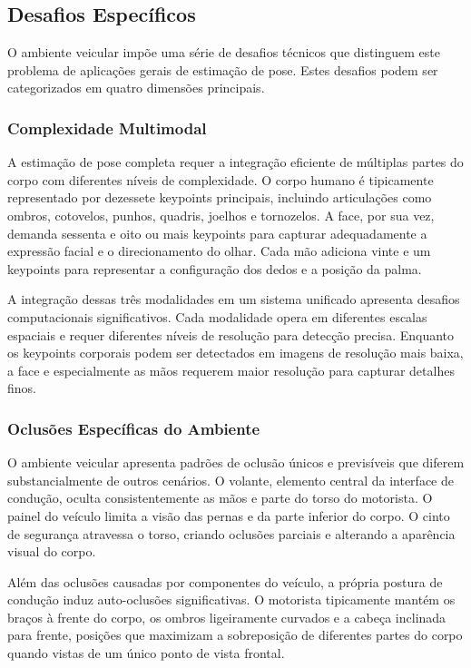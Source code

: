 \documentclass[12pt, a4paper]{article}
\begin{document}
\subsection{Desafios Específicos}

O ambiente veicular impõe uma série de desafios técnicos que distinguem este problema de aplicações gerais de estimação de pose. Estes desafios podem ser categorizados em quatro dimensões principais.

\subsubsection{Complexidade Multimodal}

A estimação de pose completa requer a integração eficiente de múltiplas partes do corpo com diferentes níveis de complexidade. O corpo humano é tipicamente representado por dezessete keypoints principais, incluindo articulações como ombros, cotovelos, punhos, quadris, joelhos e tornozelos. A face, por sua vez, demanda sessenta e oito ou mais keypoints para capturar adequadamente a expressão facial e o direcionamento do olhar. Cada mão adiciona vinte e um keypoints para representar a configuração dos dedos e a posição da palma.

A integração dessas três modalidades em um sistema unificado apresenta desafios computacionais significativos. Cada modalidade opera em diferentes escalas espaciais e requer diferentes níveis de resolução para detecção precisa. Enquanto os keypoints corporais podem ser detectados em imagens de resolução mais baixa, a face e especialmente as mãos requerem maior resolução para capturar detalhes finos.

\subsubsection{Oclusões Específicas do Ambiente}

O ambiente veicular apresenta padrões de oclusão únicos e previsíveis que diferem substancialmente de outros cenários. O volante, elemento central da interface de condução, oculta consistentemente as mãos e parte do torso do motorista. O painel do veículo limita a visão das pernas e da parte inferior do corpo. O cinto de segurança atravessa o torso, criando oclusões parciais e alterando a aparência visual do corpo.

Além das oclusões causadas por componentes do veículo, a própria postura de condução induz auto-oclusões significativas. O motorista tipicamente mantém os braços à frente do corpo, os ombros ligeiramente curvados e a cabeça inclinada para frente, posições que maximizam a sobreposição de diferentes partes do corpo quando vistas de um único ponto de vista frontal.
\end{document}
